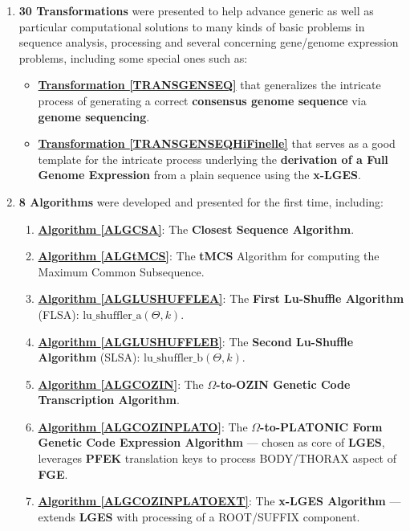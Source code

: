 \documentclass[a4paper, 18pt]{book} %
\begin{document}
\begin{enumerate}
{	and many more simple and some complex, but essential transformer utilities and specifications.

}
\item{ \textbf{30 Transformations} were presented to help advance generic as well as particular computational solutions to many kinds of basic problems in sequence analysis, processing and several concerning gene/genome expression problems, including some special ones such as:

	\begin{itemize}
	\item \textbf{\hyperref[TRANSGENSEQ]{Transformation \ref{TRANSGENSEQ}}} that generalizes the intricate process of generating a correct \textbf{consensus genome sequence} via \textbf{genome sequencing}.
	\item \textbf{\hyperref[TRANSGENSEQHiFinelle]{Transformation \ref{TRANSGENSEQHiFinelle}}} that serves as a good template for the intricate process underlying the \textbf{derivation of a Full Genome Expression} from a plain sequence using the \textbf{x-LGES}.
	\end{itemize}

 }
\item{\textbf{8 Algorithms} were developed and presented for the first time, including:
	\begin{enumerate}
	\item \textbf{\hyperref[ALGCSA]{Algorithm \ref{ALGCSA}}}: The \textbf{Closest Sequence Algorithm}.
	\item \textbf{\hyperref[ALGtMCS]{Algorithm \ref{ALGtMCS}}}: The \textbf{tMCS} Algorithm for computing the Maximum Common Subsequence.
		\item \textbf{\hyperref[ALGLUSHUFFLEA]{Algorithm \ref{ALGLUSHUFFLEA}}}: The \textbf{First Lu-Shuffle Algorithm} (FLSA): $\text{lu\_shuffler\_a}(\Theta, k)$.
	\item \textbf{\hyperref[ALGLUSHUFFLEB]{Algorithm \ref{ALGLUSHUFFLEB}}}: The \textbf{Second Lu-Shuffle Algorithm} (SLSA): $\text{lu\_shuffler\_b}(\Theta, k)$.
	\item \textbf{\hyperref[ALGCOZIN]{Algorithm \ref{ALGCOZIN}}}: The \textbf{$\Omega$-to-OZIN Genetic Code Transcription Algorithm}.
	\item \textbf{\hyperref[ALGCOZINPLATO]{Algorithm \ref{ALGCOZINPLATO}}}: The \textbf{$\Omega$-to-PLATONIC Form Genetic Code Expression Algorithm} --- chosen as core of \textbf{LGES}, leverages \textbf{PFEK} translation keys to process BODY/THORAX aspect of \textbf{FGE}.
	\item \textbf{\hyperref[ALGCOZINPLATOEXT]{Algorithm \ref{ALGCOZINPLATOEXT}}}: The \textbf{x-LGES Algorithm} --- extends \textbf{LGES} with processing of a ROOT/SUFFIX component.


\end{enumerate}}
\end{enumerate}
\end{document}
